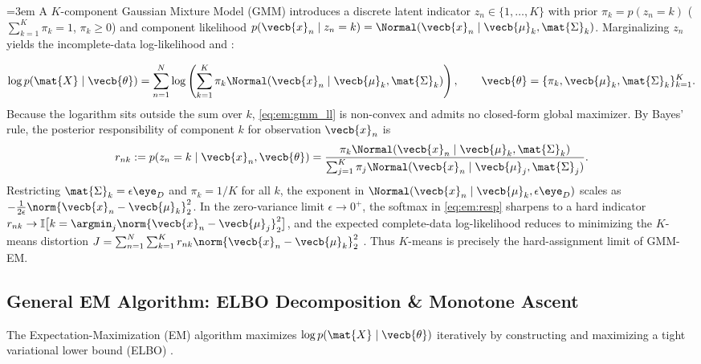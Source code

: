 \documentclass[../../../../master.tex]{subfiles}
\begin{document}
{\emergencystretch=3em
A $K$-component Gaussian Mixture Model (GMM) introduces a discrete latent indicator $z_n \in \{1,\dots,K\}$ with prior $\pi_k = p(z_n=k)$ ($\sum_{k=1}^K \pi_k = 1$, $\pi_k \ge 0$) and component likelihood $p(\vecb{x}_n \mid z_n=k) = \Normal(\vecb{x}_n \mid \vecb{\mu}_k, \mat{\Sigma}_k)$. Marginalizing $z_n$ yields the incomplete-data log-likelihood  and :
\par}
\begin{equation}
  \log p(\mat{X} \mid \vecb{\theta}) = \sum_{n=1}^N \log \left(\sum_{k=1}^K \pi_k \Normal(\vecb{x}_n \mid \vecb{\mu}_k, \mat{\Sigma}_k)\right), \qquad \vecb{\theta} = \{\pi_k, \vecb{\mu}_k, \mat{\Sigma}_k\}_{k=1}^K.
  \label{eq:em:gmm_ll}
\end{equation}
Because the logarithm sits outside the sum over $k$, \eqref{eq:em:gmm_ll} is non-convex and admits no closed-form global maximizer. By Bayes' rule, the posterior responsibility of component $k$ for observation $\vecb{x}_n$ is
\begin{equation}
  r_{nk} := p(z_n = k \mid \vecb{x}_n, \vecb{\theta}) = \frac{\pi_k \Normal(\vecb{x}_n \mid \vecb{\mu}_k, \mat{\Sigma}_k)}{\sum_{j=1}^K \pi_j \Normal(\vecb{x}_n \mid \vecb{\mu}_j, \mat{\Sigma}_j)}.
  \label{eq:em:resp}
\end{equation}
Restricting $\mat{\Sigma}_k = \epsilon \eye_D$ and $\pi_k = 1/K$ for all $k$, the exponent in $\Normal(\vecb{x}_n \mid \vecb{\mu}_k, \epsilon\eye_D)$ scales as $-\frac{1}{2\epsilon}\norm{\vecb{x}_n - \vecb{\mu}_k}_2^2$. In the zero-variance limit $\epsilon \to 0^+$, the softmax in \eqref{eq:em:resp} sharpens to a hard indicator $r_{nk} \to \mathbb{I}\big[k = \argmin_j \norm{\vecb{x}_n - \vecb{\mu}_j}_2^2\big]$, and the expected complete-data log-likelihood reduces to minimizing the $K$-means distortion $J = \sum_{n=1}^N \sum_{k=1}^K r_{nk} \norm{\vecb{x}_n - \vecb{\mu}_k}_2^2$ . Thus $K$-means is precisely the hard-assignment limit of GMM-EM.

\subsection{General EM Algorithm: ELBO Decomposition \& Monotone Ascent}
\label{subsec:em:elbo}

The Expectation-Maximization (EM) algorithm maximizes $\log p(\mat{X} \mid \vecb{\theta})$ iteratively by constructing and maximizing a tight variational lower bound (ELBO) .
\end{document}

